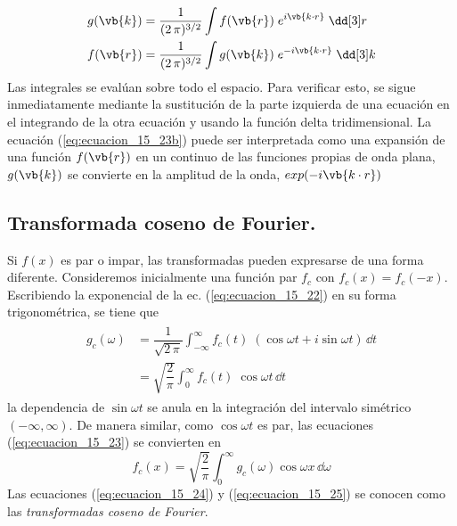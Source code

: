\begin{subequations}
\begin{align}
g (\vb{k}) &= \dfrac{1}{(2 \, \pi)^{3/2}} \int f (\vb{r}) \; e^{i \vb{k \cdot r}} \; \dd[3] r \label{eq:ecuacion_15_23a} \\
f (\vb{r}) &= \dfrac{1}{(2 \, \pi)^{3/2}} \int g (\vb{k}) \; e^{-i \vb{k \cdot r}} \; \dd[3] k \label{eq:ecuacion_15_23b}
\end{align}
\end{subequations}
Las integrales se evalúan sobre todo el espacio. Para verificar esto, se sigue inmediatamente mediante la sustitución de la parte izquierda de una ecuación en el integrando de la otra ecuación y usando la función delta tridimensional. La ecuación (\ref{eq:ecuacion_15_23b}) puede ser interpretada como una expansión de una función $f(\vb{r})$ en un continuo de las funciones propias de onda plana, $g(\vb{k})$ se convierte en la amplitud de la onda, $exp(-i \vb{k \cdot r})$
\subsection{Transformada coseno de Fourier.}
Si $f(x)$ es par o impar, las transformadas pueden expresarse de una forma diferente. Consideremos inicialmente una función par $f_{c}$ con $f_{c}(x) = f_{c}(-x)$. Escribiendo la exponencial de la ec. (\ref{eq:ecuacion_15_22}) en su forma trigonométrica, se tiene que
\begin{align}
\begin{aligned}
g_{c}(\omega) &= \dfrac{1}{\sqrt{2 \, \pi}} \int_{-\infty}^{\infty} f_{c} (t) \; (\cos \omega t + i \sin \omega t) \, \dd t \\
&= \sqrt{\dfrac{2}{\pi}} \int_{0}^{\infty} f_{c} (t) \; \cos \omega t \, \dd t 
\label{eq:ecuacion_15_24}
\end{aligned}
\end{align}
la dependencia de $\sin \omega t$ se anula en la integración del intervalo simétrico $(-\infty, \infty)$. De manera similar, como $\cos \omega t$ es par, las ecuaciones (\ref{eq:ecuacion_15_23}) se convierten en
\begin{equation}
f_{c} (x) = \sqrt{\dfrac{2}{\pi}} \int_{0}^{\infty} g_{c} (\omega) \cos \omega x \, \dd \omega 
\label{eq:ecuacion_15_25}
\end{equation}
Las ecuaciones (\ref{eq:ecuacion_15_24}) y (\ref{eq:ecuacion_15_25}) se conocen como las \emph{transformadas coseno de Fourier}.
